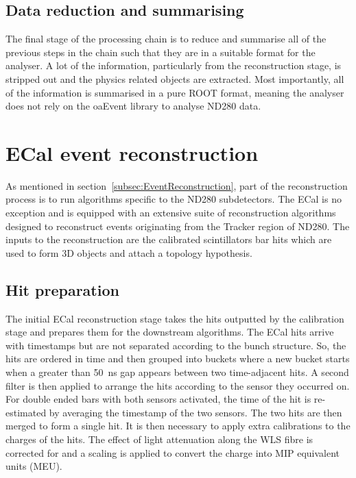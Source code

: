 \subsection{Data reduction and summarising}
\label{subsec:DataReduction}
The final stage of the processing chain is to reduce and summarise all of the previous steps in the chain such that they are in a suitable format for the analyser.  A lot of the information, particularly from the reconstruction stage, is stripped out and the physics related objects are extracted.  Most importantly, all of the information is summarised in a pure ROOT format, meaning the analyser does not rely on the oaEvent library to analyse ND280 data.


\section{ECal event reconstruction}
\label{sec:ECalEventReconstruction}
As mentioned in section~\ref{subsec:EventReconstruction}, part of the reconstruction process is to run algorithms specific to the ND280 subdetectors.  The ECal is no exception and is equipped with an extensive suite of reconstruction algorithms designed to reconstruct events originating from the Tracker region of ND280.  The inputs to the reconstruction are the calibrated scintillators bar hits which are used to form 3D objects and attach a topology hypothesis.

\subsection{Hit preparation}
\label{subsec:ECalHitPerparation}
The initial ECal reconstruction stage takes the hits outputted by the calibration stage and prepares them for the downstream algorithms.  The ECal hits arrive with timestamps but are not separated according to the bunch structure.  So, the hits are ordered in time and then grouped into buckets where a new bucket starts when a greater than 50~ns gap appears between two time-adjacent hits.  A second filter is then applied to arrange the hits according to the sensor they occurred on.  For double ended bars with both sensors activated, the time of the hit is re-estimated by averaging the timestamp of the two sensors.  The two hits are then merged to form a single hit.
\newline
It is then necessary to apply extra calibrations to the charges of the hits.  The effect of light attenuation along the WLS fibre is corrected for and a scaling is applied to convert the charge into MIP equivalent units (MEU).

